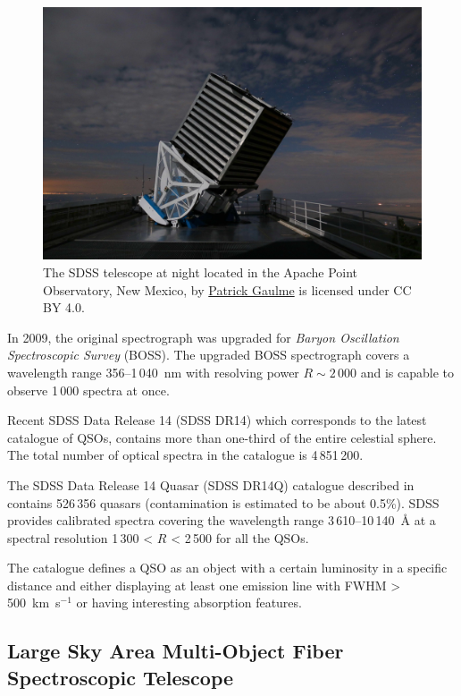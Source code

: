 \begin{figure}
\includegraphics[width=\textwidth]{img/sdss_gaulme.jpg}
\caption[SDSS telescope]{
	The SDSS telescope at night located in the Apache Point Observatory, New Mexico, by \href{https://www.sdss.org/wp-content/uploads/2016/07/sdss_gaulme1.jpg}{Patrick Gaulme} is licensed under CC BY 4.0.
	}
\label{sdss_telescope}
\end{figure}

In 2009, the original spectrograph was upgraded for \textit{Baryon Oscillation Spectroscopic Survey} (BOSS).
The upgraded BOSS spectrograph covers a wavelength range 356--1\,040~nm
with resolving power \(R \sim 2\,000\)
and is capable to observe 1\,000 spectra at once.~\cite{smee2013}

Recent SDSS Data Release 14 (SDSS DR14) which corresponds to the latest catalogue of QSOs,
contains more than one-third of the entire celestial sphere.
The total number of optical spectra in the catalogue is 4\,851\,200.

The SDSS Data Release 14 Quasar (SDSS DR14Q) catalogue described in~\cite{paris2018} contains 526\,356 quasars
(contamination is estimated to be about 0.5\%).
SDSS provides calibrated spectra covering the wavelength range 3\,610--10\,140~\AA{} at a spectral resolution 1\,300 < \(R\) < 2\,500 for all the QSOs.

The catalogue defines a QSO as an object with a certain luminosity in a specific distance
and either displaying at least one emission line with FWHM > 500~km~s\(^{-1}\)
or having interesting absorption features.

\subsection{Large Sky Area Multi-Object Fiber Spectroscopic Telescope}
\label{lamost}

